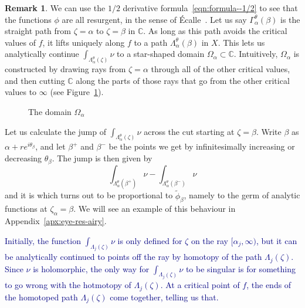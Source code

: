 \documentclass{article}
\newcommand{\C}{\mathbb{C}}
\theoremstyle{definition}
\newtheorem{remark}[definition]{Remark}
\theoremstyle{plain}
\begin{document}
\begin{remark}
We can use the $1/2$ derivative formula~\eqref{eqn:formula--1/2} to see that the functions $\phi$ are all resurgent, in the sense of \'{E}calle~\cite[Section~1]{EcalleI}. Let us say $\Gamma_\alpha^\theta(\beta)$ is the straight path from $\zeta = \alpha$ to $\zeta = \beta$ in $\C$. As long as this path avoids the critical values of $f$, it lifts uniquely along $f$ to a path $\Lambda_\alpha^\theta(\beta)$ in $X$. This lets us analytically continue $\int_{\Lambda_\alpha^\theta(\zeta)} \nu$ to a star-shaped domain $\Omega_\alpha \subset \C$. Intuitively, $\Omega_\alpha$ is constructed by drawing rays from $\zeta = \alpha$ through all of the other critical values, and then cutting $\C$ along the parts of those rays that go from the other critical values to $\infty$ (see Figure~\ref{Fig:slit domain}).
\begin{figure}
\center
{}
\caption{The domain $\Omega_\alpha$}\label{Fig:slit domain}
\end{figure}
Let us calculate the jump of $\int_{\Lambda_\alpha^\theta(\zeta)}\nu$ across the cut starting at $\zeta = \beta$. Write $\beta$ as $\alpha + re^{i\theta_\beta}$, and let $\beta^+$ and $\beta^-$ be the points we get by infinitesimally increasing or decreasing $\theta_\beta$. The jump is then given by \[\int_{\Lambda_\alpha^\theta(\beta^+)} \nu - \int_{\Lambda_\alpha^\theta(\beta^-)} \nu\] 
and it is 
which turns out to be proportional to $\tilde{\phi}_\beta$, namely to the germ of analytic functions at $\zeta_\alpha=\beta$. We will see an example of this behaviour in Appendix~\ref{apx:eye-res-airy}. 


\textcolor{Navy}{Initially, the function $\int_{\Lambda_j(\zeta)} \nu$ is only defined for $\zeta$ on the ray $[\alpha_j, \infty)$, but it can be analytically continued to points off the ray by homotopy of the path $\Lambda_j(\zeta)$. Since $\nu$ is holomorphic, the only way for $\int_{\Lambda_j(\zeta)} \nu$ to be singular is for something to go wrong with the hotmotopy of $\Lambda_j(\zeta)$. At a critical point of $f$, the ends of the homotoped path $\Lambda_j(\zeta)$ come together, telling us that.}
\end{remark}
\end{document}
